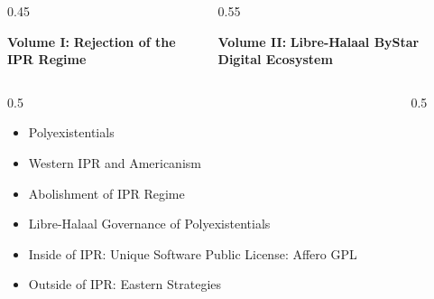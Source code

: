 \begin{whenOrg}
\begin{verblatex}
\begin{frame}[fragile,plain,label=twoVolumesConcepts]
    \begin{columns}

      \begin{column}{0.45\textwidth}

        \begin{center}
          \colorbox{blue!30}{\color{black} \textbf{Volume I:}}
          \colorbox{blue!30}{\color{black} \textbf{Rejection of the IPR Regime}}
        \end{center}
      \end{column}

      \begin{column}{0.55\textwidth}

        \begin{center}
          \colorbox{blue!60}{\color{white} \textbf{Volume II:}}
          \colorbox{blue!60}{\color{white} \textbf{Libre-Halaal ByStar Digital Ecosystem}}
        \end{center}
      \end{column}

    \end{columns}

    \bigskip

    \begin{columns}

      \begin{column}{0.5\textwidth}

        \begin{itemize}
          \item Polyexistentials
          \item Western IPR and Americanism
          \item Abolishment of IPR Regime
          \item Libre-Halaal Governance of Polyexistentials
          \item Inside of IPR: Unique Software Public License: Affero GPL
          \item Outside of IPR: Eastern Strategies
        \end{itemize}
      \end{column}

      \begin{column}{0.5\textwidth}


\end{column}
\end{columns}
\end{frame}
\end{verblatex}
\end{whenOrg}
